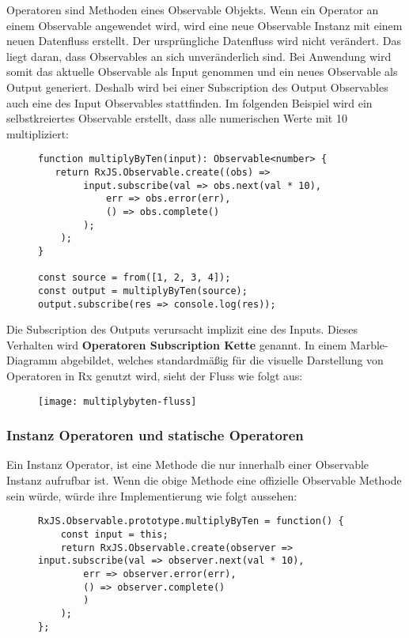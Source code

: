 \noindent
Operatoren sind Methoden eines Observable Objekts. Wenn ein Operator an einem Observable angewendet wird, wird eine neue Observable Instanz mit einem neuen Datenfluss erstellt. Der ursprüngliche Datenfluss wird nicht verändert. Das liegt daran, dass Observables an sich unveränderlich sind. Bei Anwendung wird somit das aktuelle Observable als Input genommen und ein neues Observable als Output generiert. Deshalb wird bei einer Subscription des Output Observables auch eine des Input Observables stattfinden. Im folgenden Beispiel wird ein selbstkreiertes Observable erstellt, dass alle numerischen Werte mit 10 multipliziert:

\begin{figure}[H]
\begin{lstlisting}[basicstyle=\small]
function multiplyByTen(input): Observable<number> {
   return RxJS.Observable.create((obs) =>
        input.subscribe(val => obs.next(val * 10),
            err => obs.error(err),
            () => obs.complete()
        );
    );
}

const source = from([1, 2, 3, 4]);
const output = multiplyByTen(source);
output.subscribe(res => console.log(res));
\end{lstlisting}
\end{figure}

\noindent
Die Subscription des Outputs verursacht implizit eine des Inputs. Dieses Verhalten wird \textbf{Operatoren Subscription Kette} genannt. In einem Marble-Diagramm abgebildet, welches standardmäßig für die visuelle Darstellung von Operatoren in Rx genutzt wird, sieht der Fluss wie folgt aus:

\begin{figure}[H]
\centering
\texttt{[image: multiplybyten-fluss]}
\end{figure}

\subsubsection{Instanz Operatoren und statische Operatoren}
Ein Instanz Operator, ist eine Methode die nur innerhalb einer Observable Instanz aufrufbar ist. Wenn die obige Methode eine offizielle Observable Methode sein würde, würde ihre Implementierung wie folgt aussehen:

\begin{figure}[H]
\begin{lstlisting}[basicstyle=\small]
RxJS.Observable.prototype.multiplyByTen = function() {
    const input = this;
    return RxJS.Observable.create(observer => input.subscribe(val => observer.next(val * 10),
        err => observer.error(err),
        () => observer.complete()
        )
    );
};
\end{lstlisting}
\end{figure}


